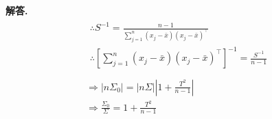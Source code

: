 \documentclass[12pt, a4paper, oneside]{ctexart}
\newenvironment{solution}{\par\noindent\textbf{解答. }}{\par}
\begin{document}
\begin{solution}
\[\begin{gathered}
{\begin{gathered}
                \therefore S^{-1} = \frac{n-1}{\sum_{j=1}^{n}(x_j-\bar{x})(x_j-\bar{x})^\top}\\
                \therefore \left[ {\sum_{j=1}^{n}(x_j-\bar{x})(x_j-\bar{x})^\top} \right]^{-1} = \frac{S^{-1}}{n-1}\\
                \end{gathered}
            }\\
            \Rightarrow \left| n\Sigma_0 \right| = \left| n\Sigma \right| \left| 1+\frac{T^{2}}{n-1} \right|\\
            \Rightarrow \frac{\Sigma_0}{\Sigma}=1+\frac{T^{2}}{n-1}
        \end{gathered}
    \]
\end{solution}
\end{document}
